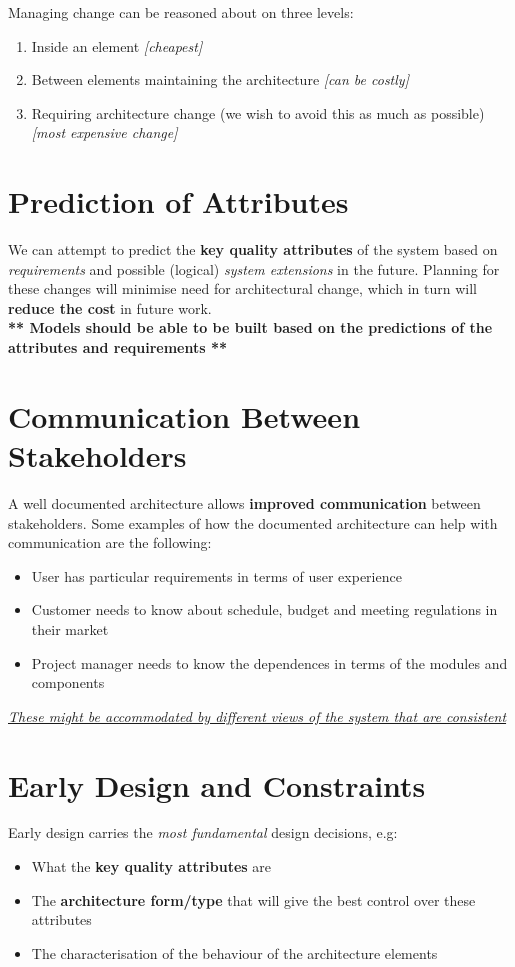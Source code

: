 \documentclass[a4paper]{report}
\begin{document}
Managing change can be reasoned about on three levels:
\begin{enumerate}
\item Inside an element \textit{[cheapest]}
\item Between elements maintaining the architecture \textit{[can be costly]}
\item Requiring architecture change (we wish to avoid this as much as possible) \textit{[most expensive change]}
\end{enumerate}

\section{Prediction of Attributes}
We can attempt to predict the \textbf{key quality attributes} of the system based on \textit{requirements} and possible (logical) \textit{system extensions} in the future. Planning for these changes will minimise need for architectural change, which in turn will \textbf{reduce the cost} in future work.\\

\textbf{** Models should be able to be built based on the predictions of the attributes and requirements **}


\section{Communication Between Stakeholders}
A well documented architecture allows \textbf{improved communication} between stakeholders. Some examples of how the documented architecture can help with communication are the following:
\begin{itemize}
\item User has particular requirements in terms of user experience
\item Customer needs to know about schedule, budget and meeting regulations in their market
\item Project manager needs to know the dependences in terms of the modules and components
\end{itemize}
\underline{\textit{These might be accommodated by different views of the system that are consistent}}

\section{Early Design and Constraints}
Early design carries the \textit{most fundamental} design decisions, e.g:
\begin{itemize}
\item What the \textbf{key quality attributes} are
\item The \textbf{architecture form/type} that will give the best control over these attributes
\item The characterisation of the behaviour of the architecture elements\\
\end{itemize}
\end{document}
